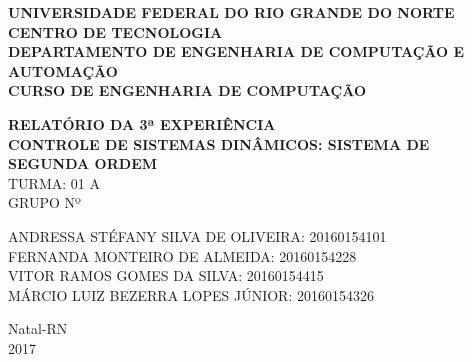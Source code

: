 \documentclass[a4paper,12pt]{article}
\begin{document}
\onehalfspacing

\thispagestyle{empty}

\setcounter{page}{1}


\begin{figure}[!ht]

\centering

\hspace{11.09cm}

\label{Logos}

\end{figure}


\vspace{-1cm}

\begin{center}
{\bf{\normalsize UNIVERSIDADE FEDERAL DO RIO GRANDE DO NORTE\\
CENTRO DE TECNOLOGIA\\
DEPARTAMENTO DE ENGENHARIA DE COMPUTAÇÃO E AUTOMAÇÃO\\
CURSO DE ENGENHARIA DE COMPUTAÇÃO
}}


\vspace{3.6cm}

{\bf{\large RELATÓRIO DA 3ª EXPERIÊNCIA\\
CONTROLE DE SISTEMAS DINÂMICOS: SISTEMA DE SEGUNDA ORDEM\\
}}
\vspace{1.5cm}
{\large TURMA: 01 A\\
	GRUPO Nº}

\vspace{3.6cm}


\begin{flushright}
\begin{normalsize}
ANDRESSA STÉFANY SILVA DE OLIVEIRA: 20160154101\\
\vspace{0.8cm}
FERNANDA MONTEIRO DE ALMEIDA: 20160154228\\
\vspace{0.8cm}
VITOR RAMOS GOMES DA SILVA: 20160154415\\
\vspace{0.8cm}
MÁRCIO LUIZ BEZERRA LOPES JÚNIOR: 20160154326\\
\end{normalsize}
\end{flushright}


\vspace{2.5cm}

{\large Natal-RN\\
2017}

\end{center}
\end{document}
